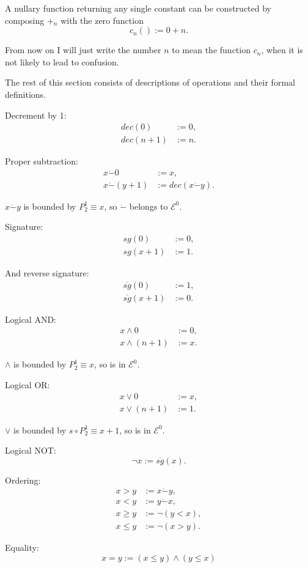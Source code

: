 \documentclass[a4paper]{article}
\newcommand{\grz}[1]{$\mathcal{E}^{#1}$}	%
\newcommand{\psub}{\dot -}	%
\newcommand{\rsg}{\overline{sg}} %
\newcommand{\recur}[1]{\begin{equation} \begin{split} #1 \end{split} \end{equation}}	%
\theoremstyle{plain}
\theoremstyle{definition}
\begin{document}
A nullary function returning any single constant can be constructed by composing $+_n$ with the zero function 
\begin{equation} c_n() := 0 + n. \end{equation}

From now on I will just write the number $n$ to mean the function $c_n$, when it is not likely to lead to confusion.

The rest of this section consists of descriptions of operations and their formal definitions.

Decrement by 1:
\recur{
	dec(0) &:= 0, \\
	dec(n+1) &:= n.
}

Proper subtraction:
\recur{
	x \psub 0 &:= x, \\
	x \psub (y+1) &:= dec(x \psub y).
}

$x \psub y$ is bounded by $P_2^1 \equiv x$, so $\psub$ belongs to \grz{0}.

Signature:
\recur{
	sg(0) &:= 0, 	\\
	sg(x+1) &:= 1.
}

And reverse signature:
\recur{
	\rsg(0) &:= 1, \\
	\rsg(x+1) &:= 0.
}

Logical AND:
\recur{
	x \wedge 0 &:= 0,	 \\
	x \wedge (n+1) &:= x.
}

$\wedge$ is bounded by $P_2^1 \equiv x$, so is in \grz{0}.

Logical OR:
\recur{
	x \vee 0 &:= x, 		\\
	x \vee (n+1) &:= 1.
}

$\vee$ is bounded by $s \circ P_2^1 \equiv x+1$, so is in \grz{0}.

Logical NOT:
\begin{equation} \neg x := \rsg(x). \end{equation}

Ordering:
\begin{equation} \begin{split} 
	x > y &:= x \psub y, 	\\
	x < y &:= y \psub x, \\
	x \geq y &:= \neg (y<x),	\\
	x \leq y &:= \neg (x>y).
\end{split} \end{equation}

Equality:
\begin{equation} x=y := (x \leq y) \wedge (y \leq x) \end{equation}
\end{document}
